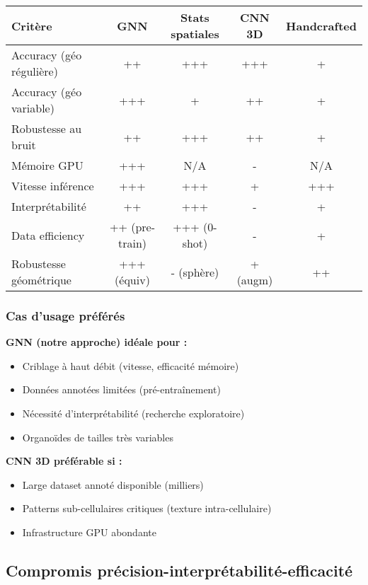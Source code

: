 \begin{center}
\begin{tabular}{|l|c|c|c|c|}
\hline
\textbf{Critère} & \textbf{GNN} & \textbf{Stats spatiales} & \textbf{CNN 3D} & \textbf{Handcrafted} \\
\hline
Accuracy (géo régulière) & ++ & +++ & +++ & + \\
Accuracy (géo variable) & +++ & + & ++ & + \\
Robustesse au bruit & ++ & +++ & ++ & + \\
Mémoire GPU & +++ & N/A & - & N/A \\
Vitesse inférence & +++ & +++ & + & +++ \\
Interprétabilité & ++ & +++ & - & + \\
Data efficiency & ++ (pre-train) & +++ (0-shot) & - & + \\
Robustesse géométrique & +++ (équiv) & - (sphère) & + (augm) & ++ \\
\hline
\end{tabular}
\end{center}

\subsubsection{Cas d'usage préférés}

\textbf{GNN (notre approche) idéale pour :}
\begin{itemize}
    \item Criblage à haut débit (vitesse, efficacité mémoire)
    \item Données annotées limitées (pré-entraînement)
    \item Nécessité d'interprétabilité (recherche exploratoire)
    \item Organoïdes de tailles très variables
\end{itemize}

\textbf{CNN 3D préférable si :}
\begin{itemize}
    \item Large dataset annoté disponible (milliers)
    \item Patterns sub-cellulaires critiques (texture intra-cellulaire)
    \item Infrastructure GPU abondante
\end{itemize}

\subsection{Compromis précision-interprétabilité-efficacité}

